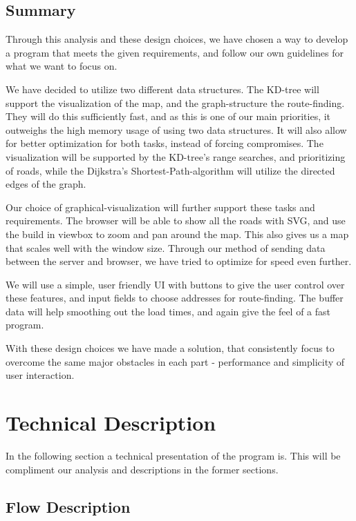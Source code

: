 \documentclass[a4paper,10pt,titlepage]{article}
\begin{document}
		\subsection{Summary}\mbox{}
Through this analysis and these design choices, we have chosen a way to develop a program that meets the given requirements, and follow our own guidelines for what we want to focus on.

We have decided to utilize two different data structures. The KD-tree will support the visualization of the map, and the graph-structure the route-finding. They will do this sufficiently fast, and as this is one of our main priorities, it outweighs the high memory usage of using two data structures. It will also allow for better optimization for both tasks, instead of forcing compromises. The visualization will be supported by the KD-tree's range searches, and prioritizing of roads, while the Dijkstra's Shortest-Path-algorithm will utilize the directed edges of the graph.

Our choice of graphical-visualization will further support these tasks and requirements. The browser will be able to show all the roads with SVG, and use the build in viewbox to zoom and pan around the map. This also gives us a map that scales well with the window size. Through our method of sending data between the server and browser, we have tried to optimize for speed even further.

We will use a simple, user friendly UI with buttons to give the user control over these features, and input fields to choose addresses for route-finding. The buffer data will help smoothing out the load times, and again give the feel of a fast program.

With these design choices we have made a solution, that consistently focus to overcome the same major obstacles in each part - performance and simplicity of user interaction.
			
	\newpage		
	\section{Technical Description}
		In the following section a technical presentation of the program is. This will be compliment our analysis and descriptions in the former sections.  
		
		\subsection{Flow Description}
\end{document}
